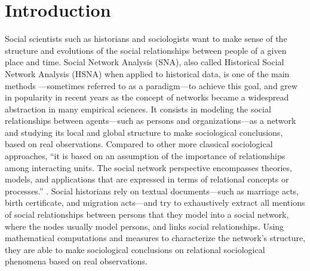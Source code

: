 


\chapter{Introduction}

Social scientists such as historians and sociologists want to make sense of the structure and evolutions of the social relationships between people of a given place and time.
Social Network Analysis (SNA), also called  Historical Social Network Analysis (HSNA) when applied to historical data, is one of the main methods ---sometimes referred to as a paradigm---to achieve this goal, and grew in popularity in recent years as the concept of networks became a widespread abstraction in many empirical sciences.
It consists in modeling the social relationships between agents---such as persons and organizations---as a network and studying its local and global structure to make sociological conclusions, based on real observations.
Compared to other more classical sociological approaches, ``it is based on an assumption of the importance of relationships among interacting units.
The social network perspective encompasses theories, models, and applications that are expressed in terms of relational concepts or processes.'' \cite{wassermanSocialNetworkAnalysis1994}.
Social historians rely on textual documents---such as marriage acts, birth certificate, and migration acts---and try to exhaustively extract all mentions of social relationships between persons that they model into a social network, where the nodes usually model persons, and links social relationships.
Using mathematical computations and measures to characterize the network's structure, they are able to make sociological conclusions on relational sociological phenomena based on real observations.

